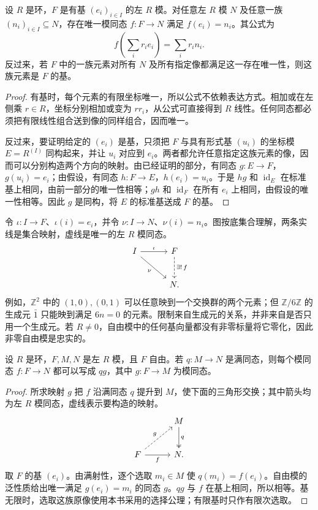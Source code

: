 \begin{theorem}[自由模的泛性质]\label{b2:thm:free-module-universal}
	设 \(R\) 是环，\(F\) 是有基 \((e_i)_{i\in I}\) 的左 \(R\) 模。对任意左 \(R\) 模 \(N\) 及任意一族 \((n_i)_{i\in I}\subseteq N\)，存在唯一模同态 \(f:F\to N\) 满足 \(f(e_i)=n_i\)。其公式为
	\[
		f\left(\sum_i r_i e_i\right)=\sum_i r_i n_i.
	\]
	反过来，若 \(F\) 中的一族元素对所有 \(N\) 及所有指定像都满足这一存在唯一性，则这族元素是 \(F\) 的基。
\end{theorem}
\begin{proof}
	有基时，每个元素的有限坐标唯一，所以公式不依赖表达方式。相加或在左侧乘 \(r\in R\)，坐标分别相加或变为 \(rr_i\)，从公式可直接得到 \(R\) 线性。任何同态都必须把有限线性组合送到像的同样组合，因而唯一。

	反过来，要证明给定的 \((e_i)\) 是基，只须把 \(F\) 与具有形式基 \((u_i)\) 的坐标模 \(E=R^{(I)}\) 同构起来，并让 \(u_i\) 对应到 \(e_i\)。两者都允许任意指定这族元素的像，因而可以分别构造两个方向的映射。由已经证明的部分，有同态 \(g:E\to F\)，\(g(u_i)=e_i\)；由假设，有同态 \(h:F\to E\)，\(h(e_i)=u_i\)。于是 \(hg\) 和 \(\operatorname{id}_E\) 在标准基上相同，由前一部分的唯一性相等；\(gh\) 和 \(\operatorname{id}_F\) 在所有 \(e_i\) 上相同，由假设的唯一性相等。因此 \(g\) 是同构，将 \(E\) 的标准基送成 \(F\) 的基。
\end{proof}

令 \(\iota:I\to F\)、\(\iota(i)=e_i\)，并令 \(\nu:I\to N\)、\(\nu(i)=n_i\)。图按底集合理解，两条实线是集合映射，虚线是唯一的左 \(R\) 模同态。
\[
	\begin{tikzcd}[column sep=3em,row sep=2.5em]
		I\arrow[r,"\iota"]\arrow[dr,"\nu"']&F\arrow[d,dashed,"\exists!\,f"]\\
		&N.
	\end{tikzcd}
\]
例如，\(\mathbb Z^2\) 中的 \((1,0),(0,1)\) 可以任意映到一个交换群的两个元素；但 \(\mathbb Z/6\mathbb Z\) 的生成元 \(\bar1\) 只能映到满足 \(6n=0\) 的元素。限制来自生成元的关系，并非来自是否只用一个生成元。若 \(R\ne0\)，自由模中的任何基向量都没有非零标量将它零化，因此非零自由模是忠实的。

\begin{proposition}\label{b2:prop:free-lifting}
	设 \(R\) 是环，\(F,M,N\) 是左 \(R\) 模，且 \(F\) 自由。若 \(q:M\to N\) 是满同态，则每个模同态 \(f:F\to N\) 都可以写成 \(qg\)，其中 \(g:F\to M\) 为模同态。
\end{proposition}
\begin{proof}
	所求映射 \(g\) 把 \(f\) 沿满同态 \(q\) 提升到 \(M\)，使下面的三角形交换；其中箭头均为左 \(R\) 模同态，虚线表示要构造的映射。
	\[
		\begin{tikzcd}[column sep=3em,row sep=2.5em]
			&M\arrow[d,two heads,"q"]\\
			F\arrow[r,"f"']\arrow[ur,dashed,"g"]&N.
		\end{tikzcd}
	\]
	取 \(F\) 的基 \((e_i)\)。由满射性，逐个选取 \(m_i\in M\) 使 \(q(m_i)=f(e_i)\)。自由模的泛性质给出唯一满足 \(g(e_i)=m_i\) 的同态 \(g\)。\(qg\) 与 \(f\) 在基上相同，所以相等。基无限时，选取这族原像使用本书采用的选择公理；有限基时只作有限次选取。
\end{proof}

